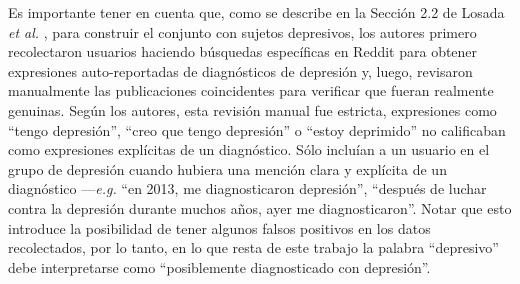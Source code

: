 Es importante tener en cuenta que, como se describe en la Sección 2.2 de Losada \emph{et al.} \cite{losada2016test}, para construir el conjunto con sujetos depresivos, los autores primero recolectaron usuarios haciendo búsquedas específicas en Reddit para obtener expresiones auto-reportadas de diagnósticos de depresión y, luego, revisaron manualmente las publicaciones coincidentes para verificar que fueran realmente genuinas.
Según los autores, esta revisión manual fue estricta, expresiones como ``tengo depresión'', ``creo que tengo depresión'' o ``estoy deprimido'' no calificaban como expresiones explícitas de un diagnóstico. Sólo incluían a un usuario en el grupo de depresión cuando hubiera una mención clara y explícita de un diagnóstico ---\emph{e.g.} ``en 2013, me diagnosticaron depresión'', ``después de luchar contra la depresión durante muchos años, ayer me diagnosticaron''. Notar que esto introduce la posibilidad de tener algunos falsos positivos en los datos recolectados, por lo tanto, en lo que resta de este trabajo la palabra ``depresivo'' debe interpretarse como ``posiblemente diagnosticado con depresión''.

